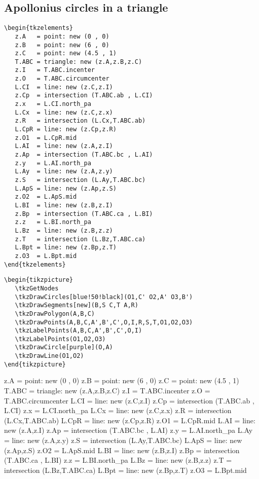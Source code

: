 
\subsection{Apollonius circles in a triangle} %
\label{sub:apollonius_circles}


\begin{Verbatim}
\begin{tkzelements}
   z.A   = point: new (0 , 0)
   z.B   = point: new (6 , 0)   
   z.C   = point: new (4.5 , 1)
   T.ABC = triangle: new (z.A,z.B,z.C)
   z.I   = T.ABC.incenter
   z.O   = T.ABC.circumcenter    
   L.CI  = line: new (z.C,z.I)
   z.Cp  = intersection (T.ABC.ab , L.CI)
   z.x   = L.CI.north_pa
   L.Cx  = line: new (z.C,z.x)
   z.R   = intersection (L.Cx,T.ABC.ab)
   L.CpR = line: new (z.Cp,z.R)
   z.O1  = L.CpR.mid   
   L.AI  = line: new (z.A,z.I)
   z.Ap  = intersection (T.ABC.bc , L.AI)
   z.y   = L.AI.north_pa
   L.Ay  = line: new (z.A,z.y)
   z.S   = intersection (L.Ay,T.ABC.bc)
   L.ApS = line: new (z.Ap,z.S)
   z.O2  = L.ApS.mid 
   L.BI  = line: new (z.B,z.I)
   z.Bp  = intersection (T.ABC.ca , L.BI)
   z.z   = L.BI.north_pa
   L.Bz  = line: new (z.B,z.z)
   z.T   = intersection (L.Bz,T.ABC.ca)
   L.Bpt = line: new (z.Bp,z.T)
   z.O3  = L.Bpt.mid
\end{tkzelements}
\end{Verbatim}
\begin{Verbatim}
\begin{tikzpicture}
   \tkzGetNodes
   \tkzDrawCircles[blue!50!black](O1,C' O2,A' O3,B')
   \tkzDrawSegments[new](B,S C,T A,R)
   \tkzDrawPolygon(A,B,C)
   \tkzDrawPoints(A,B,C,A',B',C',O,I,R,S,T,O1,O2,O3)
   \tkzLabelPoints(A,B,C,A',B',C',O,I)
   \tkzLabelPoints(O1,O2,O3)
   \tkzDrawCircle[purple](O,A)
   \tkzDrawLine(O1,O2)
\end{tikzpicture}
\end{Verbatim}

\begin{tkzelements}
z.A   = point: new (0 , 0)
z.B   = point: new (6 , 0)   
z.C   = point: new (4.5 , 1)
T.ABC = triangle: new (z.A,z.B,z.C)
z.I   = T.ABC.incenter
z.O   = T.ABC.circumcenter    
L.CI  = line: new (z.C,z.I)
z.Cp  = intersection (T.ABC.ab , L.CI)
z.x   = L.CI.north_pa
L.Cx  = line: new (z.C,z.x)
z.R   = intersection (L.Cx,T.ABC.ab)
L.CpR = line: new (z.Cp,z.R)
z.O1  = L.CpR.mid   
L.AI  = line: new (z.A,z.I)
z.Ap  = intersection (T.ABC.bc , L.AI)
z.y   = L.AI.north_pa
L.Ay  = line: new (z.A,z.y)
z.S   = intersection (L.Ay,T.ABC.bc)
L.ApS = line: new (z.Ap,z.S)
z.O2  = L.ApS.mid 
L.BI  = line: new (z.B,z.I)
z.Bp  = intersection (T.ABC.ca , L.BI)
z.z   = L.BI.north_pa
L.Bz  = line: new (z.B,z.z)
z.T   = intersection (L.Bz,T.ABC.ca)
L.Bpt = line: new (z.Bp,z.T)
z.O3  = L.Bpt.mid
\end{tkzelements}



